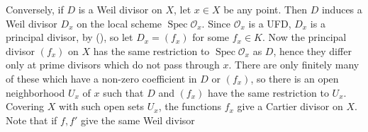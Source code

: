 {Conversely, if $D$ is a Weil divisor on $X$, let $x\in X$ be any point. Then $D$ induces a Weil divisor $D_x$ on the local scheme $\operatorname{Spec}\mathcal O_x$. Since $\mathcal O_x$ is a UFD, $D_x$ is a principal divisor, by (), so let $D_x=(f_x)$ for some $f_x\in K$. Now the principal divisor $(f_x)$ on $X$ has the same restriction to $\operatorname{Spec}\mathcal O_x$ as $D$, hence they differ only at prime divisors which do not pass through $x$. There are only finitely many of these which have a non-zero coefficient in $D$ or $(f_x)$, so there is an open neighborhood $U_x$ of $x$ such that $D$ and $(f_x)$ have the same restriction to $U_x$. Covering $X$ with such open sets $U_x$, the functions $f_x$ give a Cartier divisor on $X$. Note that if $f,f'$ give the same Weil divisor
}
